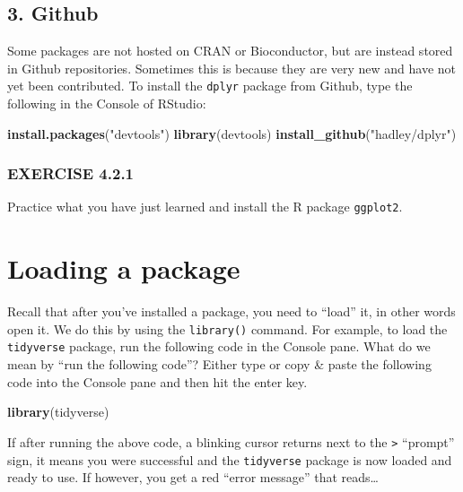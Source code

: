 \documentclass[
]{book}
\newenvironment{Shaded}{\begin{snugshade}}{\end{snugshade}}
\newcommand{\FunctionTok}[1]{\textcolor[rgb]{0.13,0.29,0.53}{\textbf{#1}}}
\newcommand{\NormalTok}[1]{#1}
\newcommand{\StringTok}[1]{\textcolor[rgb]{0.31,0.60,0.02}{#1}}
\begin{document}
\subsection*{3. Github}\label{github}

Some packages are not hosted on CRAN or Bioconductor, but are instead stored in Github repositories. Sometimes this is because they are very new and have not yet been contributed. To install the \texttt{dplyr} package from Github, type the following in the Console of RStudio:

\begin{Shaded}
\begin{Highlighting}[]
\FunctionTok{install.packages}\NormalTok{(}\StringTok{"devtools"}\NormalTok{)}
\FunctionTok{library}\NormalTok{(devtools)}
\FunctionTok{install\_github}\NormalTok{(}\StringTok{"hadley/dplyr"}\NormalTok{)}
\end{Highlighting}
\end{Shaded}

\subsubsection*{EXERCISE 4.2.1}\label{exercise-4.2.1}

Practice what you have just learned and install the R package \texttt{ggplot2}.

\section{Loading a package}\label{loading-a-package}

Recall that after you've installed a package, you need to ``load'' it, in other words open it. We do this by using the \texttt{library()} command. For example, to load the \texttt{tidyverse} package, run the following code in the Console pane. What do we mean by ``run the following code''? Either type or copy \& paste the following code into the Console pane and then hit the enter key.

\begin{Shaded}
\begin{Highlighting}[]
\FunctionTok{library}\NormalTok{(tidyverse)}
\end{Highlighting}
\end{Shaded}

If after running the above code, a blinking cursor returns next to the \texttt{\textgreater{}} ``prompt'' sign, it means you were successful and the \texttt{tidyverse} package is now loaded and ready to use. If however, you get a red ``error message'' that reads\ldots{}
\end{document}
